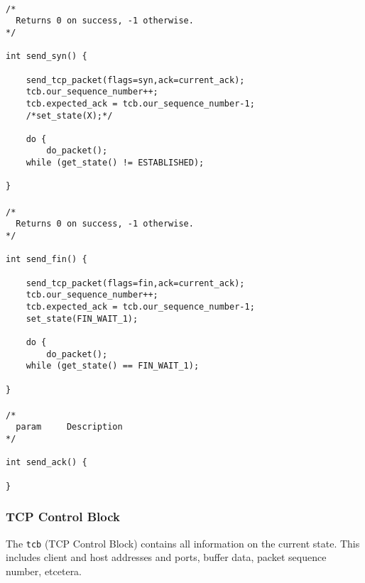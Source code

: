 \documentclass[11pt]{article}
\begin{document}
\paragraph{}



\begin{lstlisting}[title=Procedure send\_syn]
/*
  Returns 0 on success, -1 otherwise.
*/

int send_syn() {

    send_tcp_packet(flags=syn,ack=current_ack);
    tcb.our_sequence_number++;
    tcb.expected_ack = tcb.our_sequence_number-1;
    /*set_state(X);*/

    do {
        do_packet();
    while (get_state() != ESTABLISHED);

}
\end{lstlisting}


\paragraph{}


\begin{lstlisting}[title=Procedure send\_fin]
/*
  Returns 0 on success, -1 otherwise.
*/

int send_fin() {

    send_tcp_packet(flags=fin,ack=current_ack);
    tcb.our_sequence_number++;
    tcb.expected_ack = tcb.our_sequence_number-1;
    set_state(FIN_WAIT_1);

    do {
        do_packet();
    while (get_state() == FIN_WAIT_1);

}
\end{lstlisting}


\paragraph{}


\begin{lstlisting}[title=Procedure send\_ack]
/*
  param     Description
*/

int send_ack() {

}
\end{lstlisting}


\subsubsection{TCP Control Block}


The \verb|tcb| (TCP Control Block) contains all information on the
current state. This includes client and host addresses and ports, buffer
data, packet sequence number, etcetera.
\end{document}
